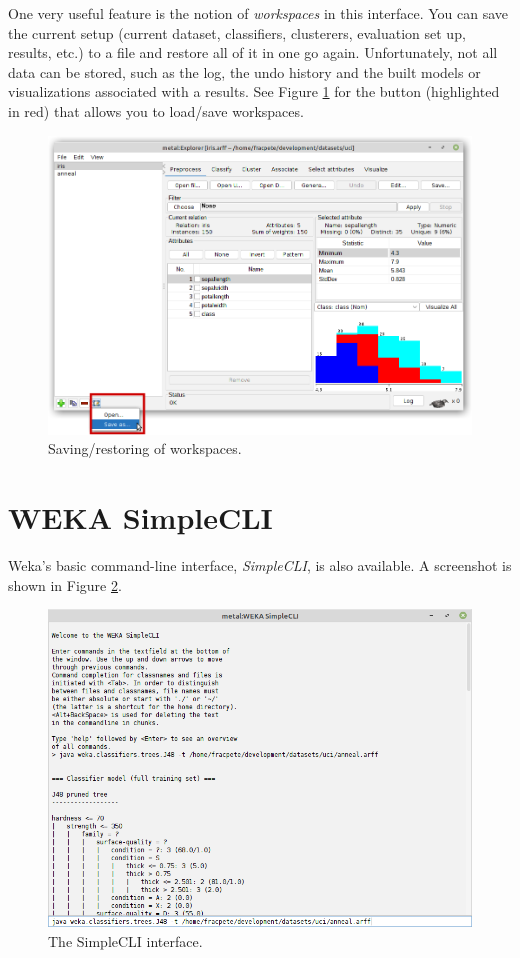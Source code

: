 One very useful feature is the notion of \textit{workspaces} in this interface.
You can save the current setup (current dataset, classifiers, clusterers,
evaluation set up, results, etc.) to a file and restore all of it in one go
again. Unfortunately, not all data can be stored, such as the log, the undo
history and the built models or visualizations associated with a results.
See Figure \ref{explorerext-workspaces} for the button (highlighted in red)
that allows you to load/save workspaces.

\begin{figure}[htb]
  \centering
  \includegraphics[width=12.0cm]{images/explorerext-workspaces.png}
  \caption{Saving/restoring of workspaces.}
  \label{explorerext-workspaces}
\end{figure}

\clearpage
\section{WEKA SimpleCLI}
Weka's basic command-line interface, \textit{SimpleCLI}, is also
available. A screenshot is shown in Figure \ref{simplecli}.

\begin{figure}[htb]
  \centering
  \includegraphics[width=12.0cm]{images/simplecli.png}
  \caption{The SimpleCLI interface.}
  \label{simplecli}
\end{figure}

